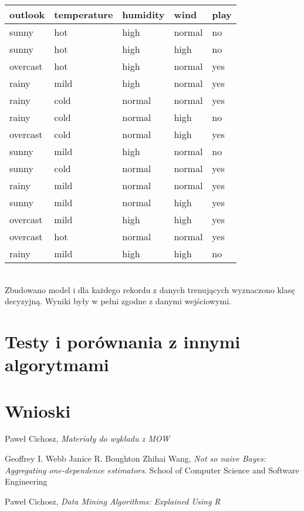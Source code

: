 \documentclass[16]{article}
\begin{document}
\begin{tabular}{ |l|l|l|l|l| }
\hline
outlook & temperature & humidity & wind & play
\\ \hline
sunny & hot & high & normal & no
\\ \hline
sunny & hot & high & high & no
\\ \hline
overcast & hot & high & normal & yes
\\ \hline
rainy & mild & high & normal & yes
\\ \hline
rainy & cold & normal & normal & yes
\\ \hline
rainy & cold & normal & high & no
\\ \hline
overcast & cold & normal & high & yes
\\ \hline
sunny & mild & high & normal & no
\\ \hline
sunny & cold & normal & normal & yes
\\ \hline
rainy & mild & normal & normal & yes
\\ \hline
sunny & mild & normal & high & yes
\\ \hline
overcast & mild & high & high & yes
\\ \hline
overcast & hot & normal & normal & yes
\\ \hline
rainy & mild & high & high & no
\\ \hline
\end{tabular}\\

Zbudowano model i dla każdego rekordu z danych trenujących wyznaczono klasę decyzyjną. Wyniki były w pełni zgodne z danymi wejściowymi. 


\section{Testy i porównania z innymi algorytmami}
\section{Wnioski}


\begin{thebibliography}{9}
	
		Paweł Cichosz,
		\emph{Materiały do wykładu z MOW}
			
		Geoffrey I. Webb
		Janice R. Boughton
		Zhihai Wang,
		\emph{Not so naive Bayes: Aggregating one-dependence estimators}.
		School of Computer Science and Software Engineering
    
		Paweł Cichosz,
		\emph{Data Mining Algorithms: Explained Using R}
\end{thebibliography}
\end{document}
